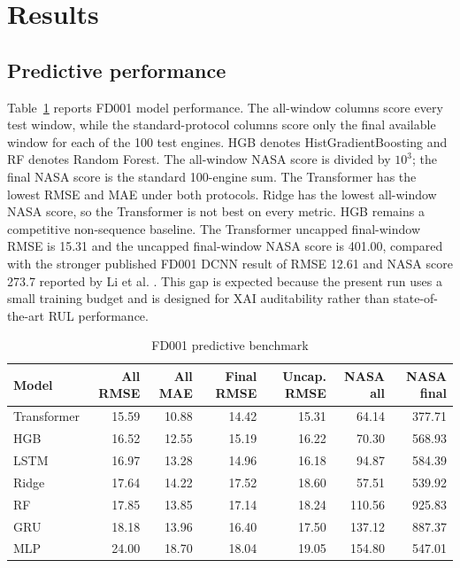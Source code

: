 \documentclass[conference]{IEEEtran}
\begin{document}
\section{Results}
\subsection{Predictive performance}
Table~\ref{tab:models} reports FD001 model performance. The all-window columns score every test window, while the standard-protocol columns score only the final available window for each of the 100 test engines. HGB denotes HistGradientBoosting and RF denotes Random Forest. The all-window NASA score is divided by \(10^3\); the final NASA score is the standard 100-engine sum. The Transformer has the lowest RMSE and MAE under both protocols. Ridge has the lowest all-window NASA score, so the Transformer is not best on every metric. HGB remains a competitive non-sequence baseline. The Transformer uncapped final-window RMSE is 15.31 and the uncapped final-window NASA score is 401.00, compared with the stronger published FD001 DCNN result of RMSE 12.61 and NASA score 273.7 reported by Li et al. \cite{li2018deepcnn}. This gap is expected because the present run uses a small training budget and is designed for XAI auditability rather than state-of-the-art RUL performance.

\begin{table}[!t]
\caption{FD001 predictive benchmark}
\label{tab:models}
\centering
\scriptsize
\setlength{\tabcolsep}{1.6pt}
\begin{tabular}{@{}lrrrrrr@{}}
\toprule
Model & All RMSE & All MAE & Final RMSE & Uncap. RMSE & NASA all & NASA final \\
\midrule
Transformer & 15.59 & 10.88 & 14.42 & 15.31 & 64.14 & 377.71 \\
HGB & 16.52 & 12.55 & 15.19 & 16.22 & 70.30 & 568.93 \\
LSTM & 16.97 & 13.28 & 14.96 & 16.18 & 94.87 & 584.39 \\
Ridge & 17.64 & 14.22 & 17.52 & 18.60 & 57.51 & 539.92 \\
RF & 17.85 & 13.85 & 17.14 & 18.24 & 110.56 & 925.83 \\
GRU & 18.18 & 13.96 & 16.40 & 17.50 & 137.12 & 887.37 \\
MLP & 24.00 & 18.70 & 18.04 & 19.05 & 154.80 & 547.01 \\
\bottomrule
\end{tabular}
\end{table}
\end{document}
